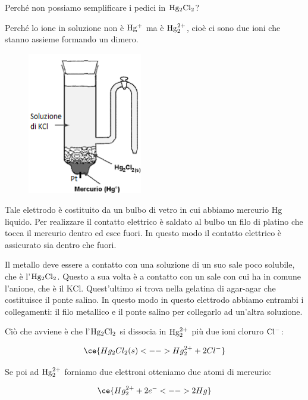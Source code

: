 Perché non possiamo semplificare i pedici in $\rm Hg_2Cl_2$?

Perché lo ione in soluzione non è $\rm Hg^+$ ma è $\rm Hg_2^{2+}$, cioè ci sono due ioni che stanno assieme formando un dimero.

\begin{minipage}{0.35\textwidth}
    \begin{figure}[H]
        \centering
        \includegraphics[width=5cm]{immagini/Elettrodo_a_calomelano.png}
    \end{figure}
\end{minipage}
\begin{minipage}{0.63\textwidth}
    \vspace{0.4cm}Tale elettrodo è costituito da un bulbo di vetro in cui abbiamo mercurio Hg liquido. Per realizzare il contatto elettrico è saldato al bulbo un filo di platino che tocca il mercurio dentro ed esce fuori. In questo modo il contatto elettrico è assicurato sia dentro che fuori.

    Il metallo deve essere a contatto con una soluzione di un suo sale poco solubile, che è l'$\rm Hg_2Cl_2$. Questo a sua volta è a contatto con un sale con cui ha in comune l'anione, che è il KCl. Quest'ultimo si trova nella gelatina di agar-agar che costituisce il ponte salino. In questo modo in questo elettrodo abbiamo entrambi i collegamenti: il filo metallico e il ponte salino per collegarlo ad un'altra soluzione.
\end{minipage}

\vspace{0.4cm}Ciò che avviene è che l'$\rm Hg_2Cl_2$ si dissocia in $\rm Hg_2^{2+}$ più due ioni cloruro $\rm Cl^-$:

$$\ce{Hg_2Cl_2(s) <--> Hg_2^{2+} + 2Cl^-}$$

Se poi ad $\rm Hg_2^{2+}$ forniamo due elettroni otteniamo due atomi di mercurio:

$$\ce{ Hg_2^{2+} + 2e^- <--> 2Hg}$$

